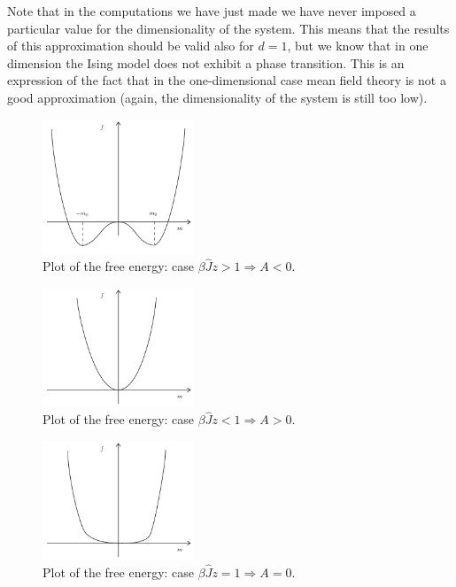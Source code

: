 \documentclass[../../Main/Main.tex]{subfiles}
\begin{document}
\begin{remark}
Note that in the computations we have just made we have never imposed a particular value for the dimensionality of the system. This means that the results of this approximation should be valid also for \(d=1\), but we know that in one dimension the Ising model does not exhibit a phase transition. This is an expression of the fact that in the one-dimensional case mean field theory is not a good approximation (again, the dimensionality of the system is still too low).
\end{remark}

\begin{figure}[h!]
\centering
\includegraphics[width=0.4\textwidth]{./img/2.pdf}
\caption{\label{fig:11_2} Plot of the free energy: case \( \beta \hat{J} z > 1 \Rightarrow A<0 \).}
\end{figure} 
\begin{figure}[h!]
\centering
\includegraphics[width=0.4\textwidth]{./img/3.pdf}
\caption{\label{fig:11_3} Plot of the free energy: case \( \beta \hat{J} z < 1 \Rightarrow A>0 \).}
\end{figure}
\begin{figure}[h!]
\centering
\includegraphics[width=0.4\textwidth]{./img/4.pdf}
\caption{\label{fig:11_4} Plot of the free energy: case \( \beta \hat{J} z = 1 \Rightarrow A=0 \).}
\end{figure}
\end{document}
